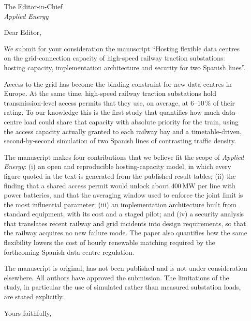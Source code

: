 \documentclass[11pt]{letter}
\begin{document}
\begin{letter}{The Editor-in-Chief\\ \textit{Applied Energy}}
\opening{Dear Editor,}

We submit for your consideration the manuscript ``Hosting flexible data centres on the grid-connection capacity of high-speed railway traction substations: hosting capacity, implementation architecture and security for two Spanish lines''.

Access to the grid has become the binding constraint for new data centres in Europe. At the same time, high-speed railway traction substations hold transmission-level access permits that they use, on average, at 6--10\,\% of their rating. To our knowledge this is the first study that quantifies how much data-centre load could share that capacity with absolute priority for the train, using the access capacity actually granted to each railway bay and a timetable-driven, second-by-second simulation of two Spanish lines of contrasting traffic density.

The manuscript makes four contributions that we believe fit the scope of \textit{Applied Energy}: (i) an open and reproducible hosting-capacity model, in which every figure quoted in the text is generated from the published result tables; (ii) the finding that a shared access permit would unlock about 400\,MW per line with power batteries, and that the averaging window used to enforce the joint limit is the most influential parameter; (iii) an implementation architecture built from standard equipment, with its cost and a staged pilot; and (iv) a security analysis that translates recent railway and grid incidents into design requirements, so that the railway acquires no new failure mode. The paper also quantifies how the same flexibility lowers the cost of hourly renewable matching required by the forthcoming Spanish data-centre regulation.

The manuscript is original, has not been published and is not under consideration elsewhere. All authors have approved the submission. The limitations of the study, in particular the use of simulated rather than measured substation loads, are stated explicitly.

\closing{Yours faithfully,}
\end{letter}
\end{document}

